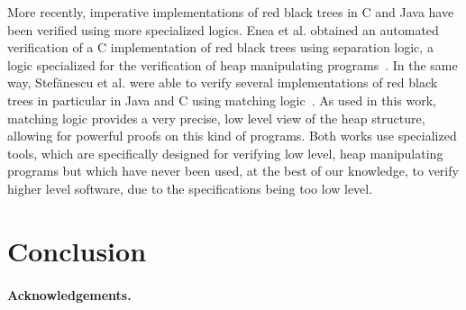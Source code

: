 \documentclass{llncs}
\begin{document}
More recently, imperative implementations of red black trees in C and Java have been verified using more specialized logics.
Enea et al. obtained an automated verification of a C implementation of red black trees using separation logic, a logic
specialized for the verification of heap manipulating programs~\cite{enea2015automated}. In the
same way, Stef{\u{a}}nescu et al. were able to verify several implementations of red black trees in particular in Java and
C using matching logic~\cite{stefuanescu2016semantics}. As used in this work, matching logic provides a very precise, low
level view of the heap structure, allowing for powerful proofs on this kind of programs. Both works use specialized tools,
which are specifically designed for verifying low level, heap manipulating programs but which have never been used, at the best
of our knowledge, to verify higher level software, due to the specifications being too low level.

\section{Conclusion}


\paragraph*{Acknowledgements.}




\end{document}
